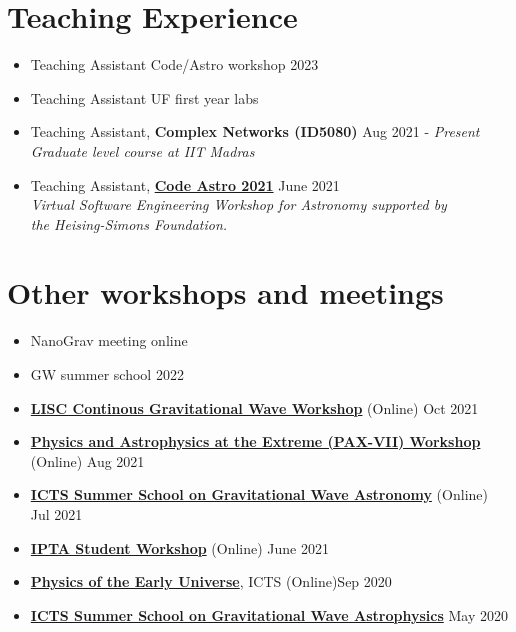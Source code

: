 \documentclass[margin, centered]{res}
\begin{document}
\begin{resume}
\section{Teaching Experience}
\begin{itemize}[leftmargin=*]
    \item {\color{C2} Teaching Assistant} Code/Astro workshop 2023
    \item {\color{C2} Teaching Assistant} UF first year labs
    \item {\color{C2} Teaching Assistant}, \textbf{\color{C3}Complex Networks (ID5080)} \hfill Aug 2021 - \textit{Present} \\
    \emph{Graduate level course at IIT Madras} 
    \item {\color{C2} Teaching Assistant}, \href{https://semaphorep.github.io/codeastro/}{\textbf{Code Astro 2021}}   \hfill June 2021  \\
    \emph{Virtual Software Engineering Workshop for Astronomy supported by \\ the Heising-Simons Foundation.}
\end{itemize}

\section{Other workshops and meetings}
\begin{itemize}[leftmargin=*]
    \item NanoGrav meeting online
    \item GW summer school 2022
    \item \href{https://youtu.be/zXDrQ_-WNUg}{\textbf{LISC Continous Gravitational Wave Workshop}} (Online) \hfill Oct 2021
    \item \href{https://sites.psu.edu/paxvii/}{\textbf{Physics and Astrophysics at the Extreme (PAX-VII) Workshop}} (Online) \hfill Aug 2021
	\item \href{https://www.icts.res.in/program/gws2021}{\textbf{ICTS Summer School on Gravitational Wave Astronomy}} (Online) \hfill Jul 2021 
	\item \href{http://ipta4gw.org/meetings/2021/}{\textbf{IPTA Student Workshop}} (Online) \hfill June 2021 
	\item \href{https://www.icts.res.in/program/peu}{\textbf{Physics of the Early Universe}}, ICTS (Online)\hfill  Sep 2020 
	\item \href{https://www.icts.res.in/program/gws2020}{\textbf{ICTS Summer School on Gravitational Wave Astrophysics}} \hfill May 2020 
\end{itemize}


\end{resume}
\end{document}
